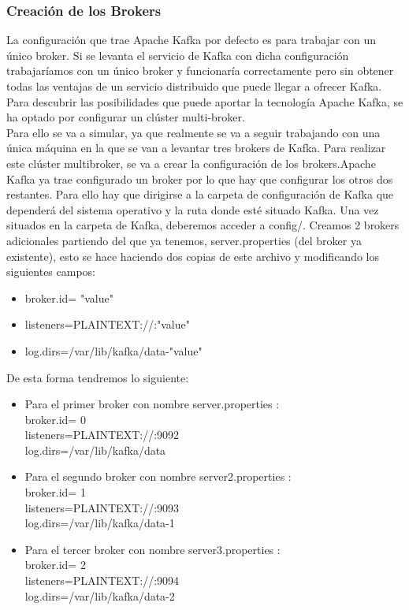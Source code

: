 \documentclass[12pt, a4paper, twoside]{article}
\begin{document}
\subsubsection{Creación de los Brokers}
La configuración que trae Apache Kafka por defecto es para trabajar con un único broker. Si se  levanta el  servicio  de  Kafka  con  dicha configuración  trabajaríamos  con  un  único broker  y  funcionaría  correctamente  pero  sin  obtener  todas  las  ventajas  de  un  servicio distribuido que puede llegar a ofrecer Kafka. Para descubrir las posibilidades que puede aportar la tecnología Apache Kafka, se  ha  optado  por configurar  un  clúster  multi-broker.\\
Para  ello  se  va  a  simular,  ya  que  realmente se  va a seguir trabajando con una única máquina en la que se van a levantar tres brokers  de Kafka. Para realizar este clúster multibroker, se va a crear la configuración de los brokers.\newpage Apache Kafka ya trae configurado un broker  por lo que hay que configurar los otros dos restantes. Para ello hay que dirigirse a la carpeta de configuración de Kafka que dependerá del sistema operativo y la ruta donde esté situado Kafka. Una vez situados en la carpeta de Kafka, deberemos acceder a config/. Creamos 2 brokers adicionales partiendo del que ya tenemos, server.properties (del broker ya existente),  esto se hace haciendo dos copias de este archivo y modificando  los siguientes campos:
\begin{itemize}
\item broker.id= "value"
\item listeners=PLAINTEXT://:"value"
\item log.dirs=/var/lib/kafka/data-"value"
\end{itemize}

De esta forma tendremos lo siguiente:
\begin{itemize}
\item Para el primer broker con nombre server.properties :\\
		broker.id= 0\\
		listeners=PLAINTEXT://:9092\\
		log.dirs=/var/lib/kafka/data\\
\item Para el segundo broker con nombre server2.properties :\\
		broker.id= 1\\
		listeners=PLAINTEXT://:9093\\
		log.dirs=/var/lib/kafka/data-1\\
\item Para el tercer broker  con nombre server3.properties :\\
		broker.id= 2\\
		listeners=PLAINTEXT://:9094\\
		log.dirs=/var/lib/kafka/data-2\\
\end{itemize}
\end{document}
